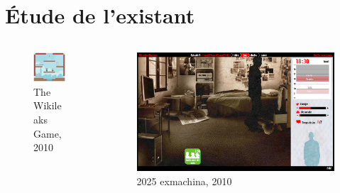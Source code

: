 \documentclass[usepdftitle=false]{beamer}
\begin{document}
	\section{Étude de l'existant}
	\begin{frame}		
		\begin{columns}[T]
			\begin{column}{5cm}
				\begin{figure}
    					\includegraphics[scale=0.3]{wikigame.png}
    					\caption{{\tiny The Wikileaks Game, 2010}}
				\end{figure}
			\end{column}

			\begin{column}{5cm}
				\begin{figure}
    					\includegraphics[scale=0.15]{exm.png}
    					\caption{{\tiny 2025 exmachina, 2010}}
				\end{figure}
			\end{column}
		\end{columns}
		

\end{frame}
\end{document}

